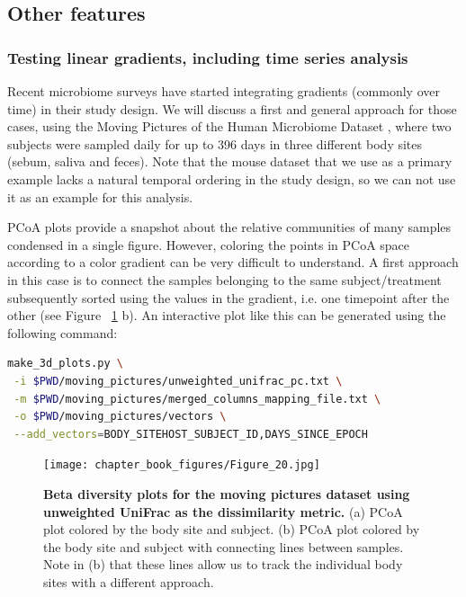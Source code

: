 \subsection{Other features}
\subsubsection{Testing linear gradients, including time series analysis}

Recent microbiome surveys have started integrating gradients (commonly over time) in their study design.
We will discuss a first and general approach for those cases, using the Moving Pictures of the Human
Microbiome Dataset \cite{Caporaso2011}, where two subjects were sampled daily for up to 396 days in three
different body sites (sebum, saliva and feces). Note that the mouse dataset that we use as a primary example
lacks a natural temporal ordering in the study design, so we can not use it as an example for this analysis.

PCoA plots provide a snapshot about the relative communities of many samples condensed in a single figure.
However, coloring the points in PCoA space according to a color gradient can be very difficult to understand.
A first approach in this case is to connect the samples belonging to the same subject/treatment subsequently
sorted using the values in the gradient, i.e. one timepoint after the other (see Figure ~\ref{bfigure20} b).
An interactive plot like this can be generated using the following command:

\begin{lstlisting}[language=bash]
make_3d_plots.py \
 -i $PWD/moving_pictures/unweighted_unifrac_pc.txt \
 -m $PWD/moving_pictures/merged_columns_mapping_file.txt \
 -o $PWD/moving_pictures/vectors \
 --add_vectors=BODY_SITEHOST_SUBJECT_ID,DAYS_SINCE_EPOCH
\end{lstlisting}

\begin{figure}[htbp]
\texttt{[image: chapter\_book\_figures/Figure\_20.jpg]}
\caption[Beta diversity plots for the moving pictures dataset using unweighted UniFrac as the dissimilarity metric]{\textbf{Beta diversity plots for the moving pictures dataset using unweighted UniFrac as the dissimilarity metric.}
(a) PCoA plot colored by the body site and subject. (b) PCoA plot colored by the body
site and subject with connecting lines between samples. Note in (b) that these lines
allow us to track the individual body sites with a different approach.}
\label{bfigure20}
\end{figure}

